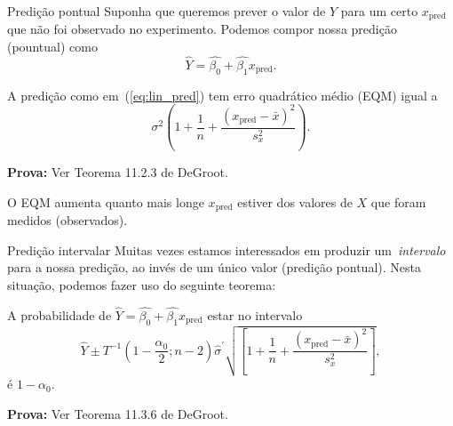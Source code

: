 \begin{frame}{Predição pontual}
Suponha que queremos prever o valor de $Y$ para um certo $x_{\text{pred}}$ que não foi observado no experimento.
Podemos compor nossa predição (pountual) como 
\begin{equation}
 \label{eq:lin_pred}
\hat{Y} = \hat{\beta_0} + \hat{\beta_1}x_{\text{pred}}. 
\end{equation}

\begin{theo}
 A predição como em~(\ref{eq:lin_pred}) tem erro quadrático médio (EQM) igual a
 \[ \sigma^2 \left(1 + \frac{1}{n} + \frac{\left(x_{\text{pred}}-\bar{x}\right)^2}{s_x^2}\right). \] 
\end{theo}
\textbf{Prova:} Ver Teorema 11.2.3 de DeGroot.

\begin{obs}
 O EQM aumenta quanto mais longe $x_{\text{pred}}$ estiver dos valores de $X$ que foram medidos (observados).
\end{obs}
\end{frame}

\begin{frame}{Predição intervalar}
Muitas vezes estamos interessados em produzir um~\textit{intervalo} para a nossa predição, ao invés de um único valor (predição pontual). 
Nesta situação, podemos fazer uso do seguinte teorema:
\begin{theo}
A probabilidade de $\hat{Y} = \hat{\beta_0} + \hat{\beta_1}x_{\text{pred}}$ estar no intervalo
\begin{equation*}
 \hat{Y} \pm T^{-1}\left(1-\frac{\alpha_0}{2}; n-2\right)\hat{\sigma}^\prime \sqrt{\left[ 1+ \frac{1}{n} + \frac{\left(x_{\text{pred}}-\bar{x}\right)^2}{s_x^2} \right]},
\end{equation*}
é $1-\alpha_0$.
\end{theo}
\textbf{Prova:} Ver Teorema 11.3.6 de DeGroot.
\end{frame}

